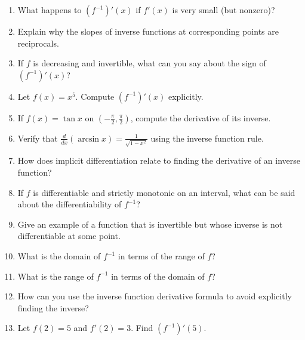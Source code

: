 \begin{enumerate}
  \item What happens to $\left(f^{-1}\right)'(x)$ if $f'(x)$ is very small (but nonzero)?
  \item Explain why the slopes of inverse functions at corresponding points are reciprocals.
  \item If $f$ is decreasing and invertible, what can you say about the sign of $\left(f^{-1}\right)'(x)$?
  \item Let $f(x) = x^5$. Compute $\left(f^{-1}\right)'(x)$ explicitly.
  \item If $f(x) = \tan x$ on $\left(-\frac{\pi}{2}, \frac{\pi}{2}\right)$, compute the derivative of its inverse.
  \item Verify that $\frac{d}{dx}(\arcsin x) = \frac{1}{\sqrt{1 - x^2}}$ using the inverse function rule.
  \item How does implicit differentiation relate to finding the derivative of an inverse function?
  \item If $f$ is differentiable and strictly monotonic on an interval, what can be said about the differentiability of $f^{-1}$?
  \item Give an example of a function that is invertible but whose inverse is not differentiable at some point.
  \item What is the domain of $f^{-1}$ in terms of the range of $f$?
  \item What is the range of $f^{-1}$ in terms of the domain of $f$?
  \item How can you use the inverse function derivative formula to avoid explicitly finding the inverse?
  \item Let $f(2) = 5$ and $f'(2) = 3$. Find $\left(f^{-1}\right)'(5)$.
\end{enumerate}
